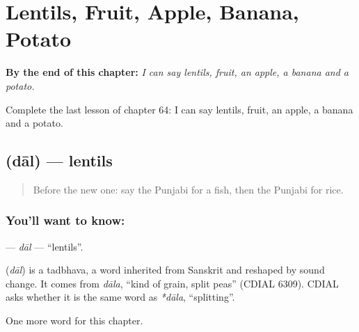 
\chapter{Lentils, Fruit, Apple, Banana, Potato}
\label{ch:pa-lentils-fruit-apple-banana-potato}

\begin{chapteropening}
\textbf{By the end of this chapter:} \emph{I can say lentils, fruit, an apple, a banana and a potato.}

Complete the last lesson of chapter 64: I can say lentils, fruit, an apple, a banana and a potato.
\end{chapteropening}

\section[\texorpdfstring{\pa{ਦਾਲ} (dāl)}{ਦਾਲ (dāl)}]{ (dāl) — lentils}

\label{lesson:PA-C64-dal}



\begin{quote}
Before the new one: say the Punjabi for a fish, then the Punjabi for rice.
\end{quote}

\subsection*{You'll want to know: }
\textbf{} — \emph{dāl} — \textquotedblleft{}lentils\textquotedblright{}.

\begin{cousinweb}
\textbf{} (\emph{dāl}) is a tadbhava, a word inherited from Sanskrit and reshaped by sound change. It comes from \emph{dāla}, \textquotedblleft{}kind of grain, split peas\textquotedblright{} (CDIAL 6309). CDIAL asks whether it is the same word as \emph{*dāla}, \textquotedblleft{}splitting\textquotedblright{}.
\end{cousinweb}

\begin{grammarlens}[title={What you've built}]
One more word for this chapter.
\end{grammarlens}


